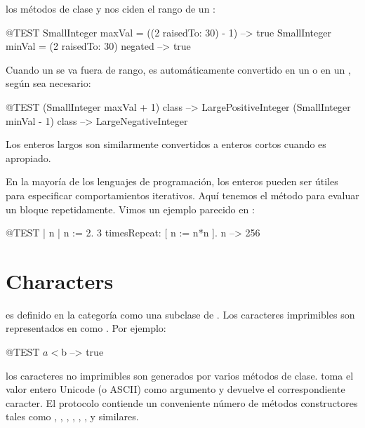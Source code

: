 \documentclass[a4paper,10pt,twoside]{book}
\begin{document}
los m\'etodos de clase  y  nos ciden el rango de un :

\begin{code}{@TEST}
SmallInteger maxVal = ((2 raisedTo: 30) - 1)      --> true
SmallInteger minVal = (2 raisedTo: 30) negated --> true
\end{code}

Cuando un  se va fuera de rango, es autom\'aticamente convertido en un   o en un , seg\'un sea necesario:

\begin{code}{@TEST}
(SmallInteger maxVal + 1) class --> LargePositiveInteger
(SmallInteger minVal - 1) class  --> LargeNegativeInteger
\end{code}

Los enteros largos son similarmente convertidos a enteros cortos cuando es apropiado.

En la mayor\'ia de los lenguajes de programaci\'on, los enteros pueden ser \'utiles para especificar comportamientos iterativos. Aqu\'i tenemos el m\'etodo  para evaluar un bloque repetidamente.
Vimos un ejemplo parecido en :

\begin{code}{@TEST | n |}
n := 2.
3 timesRepeat: [ n := n*n ].
n --> 256
\end{code}

\section{Characters}

 es definido en la categor\'ia  como una subclase de . Los caracteres imprimibles son representados en \pharo como .  Por ejemplo:

\begin{code}{@TEST}
$a < $b --> true
\end{code}

los caracteres no imprimibles son generados por varios m\'etodos de clase.  \mbox{} toma el valor entero Unicode (o ASCII) como argumento y devuelve el correspondiente caracter. El protocolo  contiende un conveniente n\'umero de m\'etodos constructores tales como   , , , , , , y similares.
\end{document}
